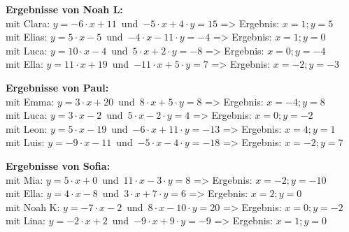 \begin{minipage}{\textwidth}
\textbf{Ergebnisse von Noah L:}\\
mit Clara: $y=-6\cdot x+11$\mbox{ }und\mbox{ }$-5\cdot x+4\cdot y=15$ => Ergebnis: $x=1;y=5$
\\
mit Elias: $y=5\cdot x-5$\mbox{ }und\mbox{ }$-4\cdot x-11\cdot y=-4$ => Ergebnis: $x=1;y=0$
\\
mit Luca: $y=10\cdot x-4$\mbox{ }und\mbox{ }$5\cdot x+2\cdot y=-8$ => Ergebnis: $x=0;y=-4$
\\
mit Ella: $y=11\cdot x+19$\mbox{ }und\mbox{ }$-11\cdot x+5\cdot y=7$ => Ergebnis: $x=-2;y=-3$
\\
\end{minipage}
\vspace*{3ex}

\begin{minipage}{\textwidth}
\textbf{Ergebnisse von Paul:}\\
mit Emma: $y=3\cdot x+20$\mbox{ }und\mbox{ }$8\cdot x+5\cdot y=8$ => Ergebnis: $x=-4;y=8$
\\
mit Luca: $y=3\cdot x-2$\mbox{ }und\mbox{ }$5\cdot x-2\cdot y=4$ => Ergebnis: $x=0;y=-2$
\\
mit Leon: $y=5\cdot x-19$\mbox{ }und\mbox{ }$-6\cdot x+11\cdot y=-13$ => Ergebnis: $x=4;y=1$
\\
mit Luis: $y=-9\cdot x-11$\mbox{ }und\mbox{ }$-5\cdot x-4\cdot y=-18$ => Ergebnis: $x=-2;y=7$
\\
\end{minipage}
\vspace*{3ex}

\begin{minipage}{\textwidth}
\textbf{Ergebnisse von Sofia:}\\
mit Mia: $y=5\cdot x+0$\mbox{ }und\mbox{ }$11\cdot x-3\cdot y=8$ => Ergebnis: $x=-2;y=-10$
\\
mit Ella: $y=4\cdot x-8$\mbox{ }und\mbox{ }$3\cdot x+7\cdot y=6$ => Ergebnis: $x=2;y=0$
\\
mit Noah K: $y=-7\cdot x-2$\mbox{ }und\mbox{ }$8\cdot x-10\cdot y=20$ => Ergebnis: $x=0;y=-2$
\\
mit Lina: $y=-2\cdot x+2$\mbox{ }und\mbox{ }$-9\cdot x+9\cdot y=-9$ => Ergebnis: $x=1;y=0$
\\
\end{minipage}
